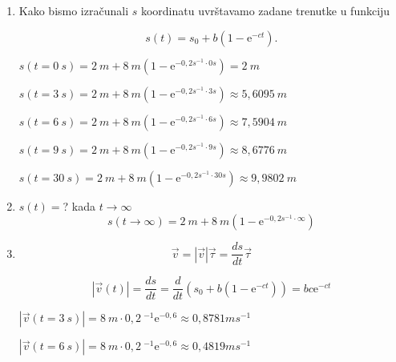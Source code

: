

\begin{enumerate}[label=\alph*)]
  \item Kako bismo izračunali $s$ koordinatu uvrštavamo zadane trenutke u funkciju 
  
  $$s(t)=s_0+b(1-\mathrm{e}^{-ct}) .$$

  $s(t=0\ s)=2\ m+ 8\ m(1-\mathrm{e}^{-0,2s^{-1}\cdot 0s})=2\ m$
  
  $s(t=3\ s)=2\ m+ 8\ m(1-\mathrm{e}^{-0,2s^{-1}\cdot 3s})\approx5,6095\ m$
  
  $s(t=6\ s)=2\ m+ 8\ m(1-\mathrm{e}^{-0,2s^{-1}\cdot 6 s})\approx7,5904\ m $
  
  $s(t=9\ s)=2\ m+ 8\ m(1-\mathrm{e}^{-0,2s^{-1}\cdot 9 s})\approx8,6776\ m$
  
  $s(t=30\ s)=2\ m+ 8\ m(1-\mathrm{e}^{-0,2s^{-1}\cdot 30 s})\approx9,9802\ m$
  \item $s(t)=$? kada $t\rightarrow\infty$
  $$ s(t\rightarrow\infty)= 2\ m+ 8\ m(1-\mathrm{e}^{-0,2s^{-1}\cdot \infty})$$
  
  \item $$\vec{v}=|\vec{v}|\vec{\tau}=\frac{ds}{dt}\vec{\tau} $$
  
  $$|\vec{v}(t)|=\frac{ds}{dt}=\frac{d}{dt}\left( s_0+b(1-\mathrm{e}^{-ct}) \right)=bc\mathrm{e}^{-ct} $$
  
  $|\vec{v}(t=3\ s)| = 8\ m \cdot 0,2\ ^{-1}\mathrm{e}^{-0,6}\approx0,8781ms^{-1} $
  
  $|\vec{v}(t=6\ s)| = 8\ m \cdot 0,2\ ^{-1}\mathrm{e}^{-0,6}\approx0,4819ms^{-1} $
\end{enumerate}
